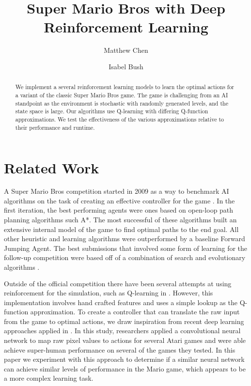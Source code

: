 \documentclass[12pt]{article}
\begin{document}
\nocite{*}

\title{Super Mario Bros with Deep Reinforcement Learning}

\author{
  Matthew Chen
  \and
  Isabel Bush
}
\date{}
\maketitle

\begin{abstract}
We implement a several reinforcement learning models to learn the optimal actions for a variant of the classic Super Mario Bros game. The game is challenging from an AI standpoint as the environment is stochastic with randomly generated levels, and the state space is large. Our algorithms use Q-learning with differing Q-function approximations. We test the effectiveness of the various approximations relative to their performance and runtime.

\end{abstract}

\section{Related Work}

A Super Mario Bros competition started in 2009 as a way to benchmark AI algorithms on the task of creating an effective controller for the game \cite{togelius20102009}. In the first iteration, the best performing agents were ones based on open-loop path planning algorithms such A*. The most successful of these algorithms built an extensive internal model of the game to find optimal paths to the end goal. All other heuristic and learning algorithms were outperformed by a baseline Forward Jumping Agent. The best submissions that involved some form of learning for the follow-up competition were based off of a combination of search and evolutionary algorithms \cite{karakovskiy2012mario}.

Outside of the official competition there have been several attempts at using reinforcement for the simulation, such as Q-learning in \cite{liao2012cs229}. However, this implementation involves hand crafted features and uses a simple lookup as the Q-function approximation. To create a controller that can translate the raw input from the game to optimal actions, we draw inspiration from recent deep learning approaches applied in \cite{mnih2013playing}. In this study, researchers applied a convolutional neural network to map raw pixel values to actions for several Atari games and were able achieve super-human performance on several of the games they tested. In this paper we experiment with this approach to determine if a similar neural network can achieve similar levels of performance in the Mario game, which appears to be a more complex learning task.
\end{document}
